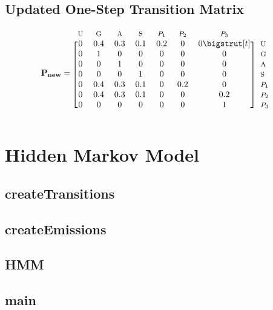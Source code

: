 \documentclass[12pt]{article}
\begin{document}
\subsection{Updated One-Step Transition Matrix}
\begin{equation*}
	\mathbf{P_{new}}=
	\begin{blockarray}{*{7}{c} l}
	  \begin{block}{*{7}{>{$\footnotesize}c<{$}} l}
		U & G & A & S & $P_1$ & $P_2$ & $P_3$ & \\
	  \end{block}
	  \begin{block}{[*{7}{c}]>{$\footnotesize}l<{$}}
		0 & 0.4 & 0.3 & 0.1& 0.2 & 0 & 0\bigstrut[t]& U \\
		0 & 1 & 0 & 0 & 0 & 0 & 0 & G \\
		0 & 0 & 1 & 0 & 0 & 0 & 0 & A \\
		0 & 0 & 0 & 1 & 0 & 0 & 0 & S \\
		0 & 0.4 & 0.3 & 0.1 & 0 & 0.2 & 0 & $P_1$ \\
		0 & 0.4 & 0.3 & 0.1 & 0 & 0 & 0.2 & $P_2$ \\
		0 & 0 & 0 & 0 & 0 & 0 & 1 & $P_3$ \\
	  \end{block}
	\end{blockarray}
\end{equation*}

\section{Hidden Markov Model}

\subsection{createTransitions}
\subsection{createEmissions}
\subsection{HMM}
\subsection{main}
\end{document}

